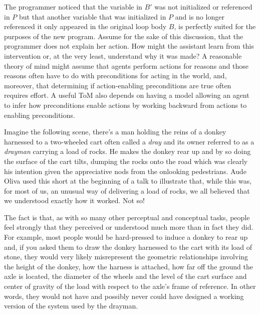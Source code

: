 The programmer noticed that the variable in $B'$ was not initialized or referenced in $P$ but that another variable that was initialized in $P$ and is no longer referenced \emdash{} it only appeared in the original loop body $B$, is perfectly suited for the purposes of the new program. Assume for the sake of this discussion, that the programmer does not explain her action. How might the assistant learn from this intervention or, at the very least, understand why it was made? A reasonable theory of mind might assume that agents perform actions for reasons and those reasons often have to do with preconditions for acting in the world, and, moreover, that determining if action-enabling preconditions are true often requires effort. A useful ToM also depends on having a model allowing an agent to infer how preconditions enable actions by working backward from actions to enabling preconditions. 


Imagine the following scene, there's a man holding the reins of a donkey harnessed to a two-wheeled cart \emdash{} often called a {\it{dray}} and its owner referred to as a {\it{drayman}} \emdash{} carrying a load of rocks. He makes the donkey rear up and by so doing the surface of the cart tilts, dumping the rocks onto the road which was clearly his intention given the appreciative nods from the onlooking pedestrians. Aude Oliva used this short {} at the beginning of a talk to illustrate that, while this was, for most of us, an unusual way of delivering a load of rocks, we all believed that we understood exactly how it worked. Not so!

The fact is that, as with so many other perceptual and conceptual tasks, people feel strongly that they perceived or understood much more than in fact they did. For example, most people would be hard-pressed to induce a donkey to rear up and, if you asked them to draw the donkey harnessed to the cart with its load of stone, they would very likely misrepresent the geometric relationships involving the height of the donkey, how the harness is attached, how far off the ground the axle is located, the diameter of the wheels and the level of the cart surface and center of gravity of the load with respect to the axle's frame of reference. In other words, they would not have \emdash{} and possibly never could have \emdash{} designed a working version of the system used by the drayman.

